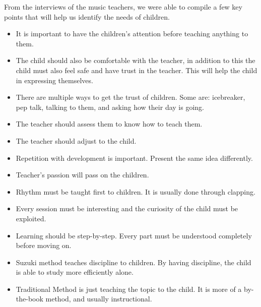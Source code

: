From the interviews of the music teachers, we were able to compile a few key points that will help us identify the needs of children.
\begin{itemize}
    \item It is important to have the children's attention before teaching anything to them.
    \item The child should also be comfortable with the teacher, in addition to this the child must also feel safe and have trust in the teacher. This will help the child in expressing themselves.
    \item There are multiple ways to get the trust of children. Some are: icebreaker, pep talk, talking to them, and asking how their day is going.
    \item The teacher should assess them to know how to teach them.
    \item The teacher should adjust to the child.
    \item Repetition with development is important. Present the same idea differently.
    \item Teacher's passion will pass on the children.
    \item Rhythm must be taught first to children. It is usually done through clapping.
    \item Every session must be interesting and the curiosity of the child must be exploited.
    \item Learning should be step-by-step. Every part must be understood completely before moving on.
    \item Suzuki method teaches discipline to children. By having discipline, the child is able to study more efficiently alone.
    \item Traditional Method is just teaching the topic to the child. It is more of a by-the-book method, and usually instructional.
\end{itemize}


